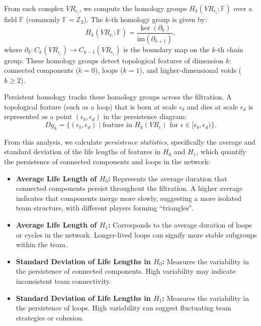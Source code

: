 \documentclass[10pt,twocolumn]{article}
\begin{document}
From each complex $VR_{\epsilon_i}$, we compute the homology groups $H_k(VR_{\epsilon_i}; \mathbb{F})$ over a field $\mathbb{F}$ (commonly $\mathbb{F}=\mathbb{Z}_2$). The $k$-th homology group is given by:
\[
H_k(VR_{\epsilon_i}; \mathbb{F}) = \frac{\ker(\partial_k)}{\mathrm{im}(\partial_{k+1})},
\]
where $\partial_k : C_k(VR_{\epsilon_i}) \to C_{k-1}(VR_{\epsilon_i})$ is the boundary map on the $k$-th chain group. These homology groups detect topological features of dimension $k$: connected components ($k=0$), loops ($k=1$), and higher-dimensional voids ($k \geq 2$).

Persistent homology tracks these homology groups across the filtration. A topological feature (such as a loop) that is born at scale $\epsilon_b$ and dies at scale $\epsilon_d$ is represented as a point $(\epsilon_b, \epsilon_d)$ in the persistence diagram:
\[
Dg_k = \{(\epsilon_b, \epsilon_d) \mid \text{feature in } H_k(VR_{\epsilon}) \text{ for } \epsilon \in [\epsilon_b,\epsilon_d)\}.
\]

From this analysis, we calculate \textit{persistence statistics}, specifically the average and standard deviation of the life lengths of features in $ H_0 $ and $ H_1 $, which quantify the persistence of connected components and loops in the network:
    
\begin{itemize}
    \item \textbf{Average Life Length of $ H_0 $:} Represents the average duration that connected components persist throughout the filtration. A higher average indicates that components merge more slowly, suggesting a more isolated team structure, with different players forming ``triangles".
    \item \textbf{Average Life Length of $ H_1 $:} Corresponds to the average duration of loops or cycles in the network. Longer-lived loops can signify more stable subgroups within the team.
    \item \textbf{Standard Deviation of Life Lengths in $ H_0 $:} Measures the variability in the persistence of connected components. High variability may indicate inconsistent team connectivity.
    \item \textbf{Standard Deviation of Life Lengths in $ H_1 $:} Measures the variability in the persistence of loops. High variability can suggest fluctuating team strategies or cohesion.
\end{itemize}
\end{document}
